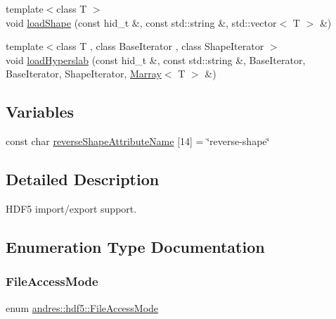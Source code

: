 \begin{DoxyCompactItemize}
\item 
{\footnotesize template$<$class T $>$ }\\void \hyperlink{namespaceandres_1_1hdf5_a9ce6bf731e79264846d466fd92eee01f}{load\+Shape} (const hid\+\_\+t \&, const std\+::string \&, std\+::vector$<$ T $>$ \&)
\item 
{\footnotesize template$<$class T , class Base\+Iterator , class Shape\+Iterator $>$ }\\void \hyperlink{namespaceandres_1_1hdf5_ab031fffd5429859c7f914d8f883a6224}{load\+Hyperslab} (const hid\+\_\+t \&, const std\+::string \&, Base\+Iterator, Base\+Iterator, Shape\+Iterator, \hyperlink{classandres_1_1Marray}{Marray}$<$ T $>$ \&)
\end{DoxyCompactItemize}
\subsection*{Variables}
\begin{DoxyCompactItemize}
\item 
const char \hyperlink{namespaceandres_1_1hdf5_acf79cfe1ea0769086a46970fd58188a7}{reverse\+Shape\+Attribute\+Name} \mbox{[}14\mbox{]} = \char`\"{}reverse-\/shape\char`\"{}
\end{DoxyCompactItemize}


\subsection{Detailed Description}
H\+D\+F5 import/export support. 

\subsection{Enumeration Type Documentation}
\mbox{\label{namespaceandres_1_1hdf5_a08660935c7de0e1e76e007fc972933b9}} 
\subsubsection{\texorpdfstring{File\+Access\+Mode}{FileAccessMode}}
{\footnotesize\ttfamily enum \hyperlink{namespaceandres_1_1hdf5_a08660935c7de0e1e76e007fc972933b9}{andres\+::hdf5\+::\+File\+Access\+Mode}}

